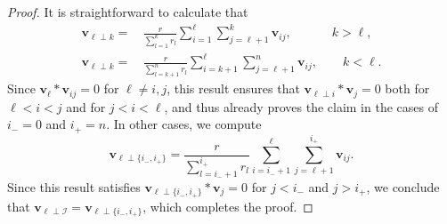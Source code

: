 \documentclass[10pt,a4paper]{amsart}
\def\be{\begin{equation}}
\newcommand{\bfv}{{\boldsymbol v}}
\newcommand{\cI}{\mathcal{I}}
\def\ee{\end{equation}}
\begin{document}
\begin{proof}
	It is straightforward to calculate that 
	\be
	\begin{split}
		\bfv_{\ell\perp k} =&\, \frac{r}{\sum_{l=1}^k r_l}\sum_{i=1}^\ell \sum_{j=\ell+1}^k \bfv_{ij},
		\qquad\quad \
		k>\ell,
		\\  
		\bfv_{\ell\perp k} =&\, \frac{r}{\sum_{l=k+1}^n r_l}\sum_{i=k+1}^\ell \sum_{j=\ell+1}^n \bfv_{ij},
		\qquad 
		k<\ell. 
	\end{split}
	\label{iperpj}
	\ee 
	Since $\bfv_\ell\ast\bfv_{ij}=0$ for $\ell\ne i,j$, 
	this result ensures that $\bfv_{\ell\perp i}\ast \bfv_j=0$ both for $\ell<i<j$ and for $j<i<\ell$, and thus already proves the claim
	in the cases of $i_-=0$ and $i_+=n$. In other cases, we compute 
	\be
		\bfv_{\ell\perp \{i_-,i_+\}} = \frac{r}{\sum_{l=i_-+1}^{i_+}r_l}\sum_{i=i_-+1}^\ell\sum_{j=\ell+1}^{i_+}\bfv_{ij}.
	\ee 
	Since this result satisfies $\bfv_{\ell\perp \{i_-,i_+\}}\ast \bfv_j=0$ for $j<i_-$ and $j>i_+$, we conclude that
	$\bfv_{\ell\perp \cI}=\bfv_{\ell\perp \{i_-,i_+\}}$, which completes the proof.
\end{proof}
\end{document}
